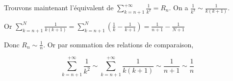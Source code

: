 \begin{exemple}
    Trouvons maintenant l'équivalent de $\displaystyle \sum_{k = n + 1}^{+ \infty } \frac 1 {k^2} = R_n$.
    On a $\displaystyle \frac 1 {k^2} \sim \frac 1 {k(k + 1)}$.

    Or $\displaystyle \sum_{k = n + 1}^{N} \frac 1 {k(k + 1)} = \sum_{k = n + 1}^{N } \left( \frac 1 k - \frac 1 {k + 1} \right) = \frac 1 {n + 1} - \frac 1 {N + 1}$

    Donc $\displaystyle R_n \sim \frac 1 n$.
    Or par sommation des relations de comparaison, 
    
    \[\sum_{k = n + 1}^{+\infty} \frac 1 {k^2} \sim \sum_{k = n + 1}^{+ \infty } \frac 1 {k(k + 1)} \sim \frac 1 {n + 1} \sim \frac 1 n\]
\end{exemple}
